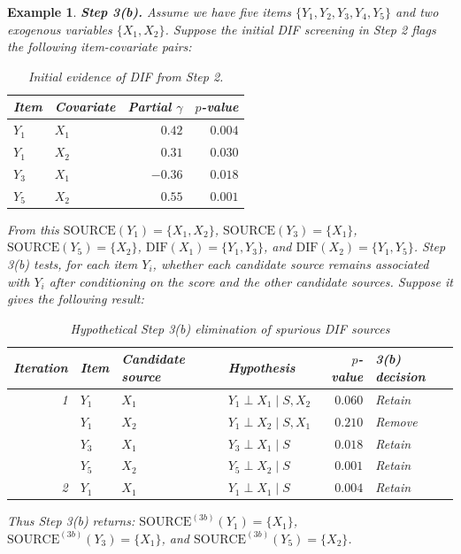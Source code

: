 \documentclass[12pt]{article}
\theoremstyle{examplestyle}
\newtheorem{example}{Example}[section]
\begin{document}
\begin{mybox3}
\begin{example}\label{ex:step3b} \textbf{Step 3(b).}
Assume we have five items $\{Y_1,Y_2,Y_3,Y_4,Y_5\}$ and two exogenous variables
$\{X_1,X_2\}$. Suppose the initial DIF screening in Step 2 flags the following
item-covariate pairs:

\begin{table}[H]
\centering
\begin{tabular}{llrr}
\hline
Item & Covariate & Partial $\gamma$ & $p$-value \\
\hline
$Y_1$ & $X_1$ & $0.42$ & $0.004$ \\
$Y_1$ & $X_2$ & $0.31$ & $0.030$ \\
$Y_3$ & $X_1$ & $-0.36$ & $0.018$ \\
$Y_5$ & $X_2$ & $0.55$ & $0.001$ \\
\hline
\end{tabular}
\caption{Initial evidence of DIF from Step 2.}
\label{tab:step3_example_initial}
\end{table}

From this $\mathrm{SOURCE}(Y_1)=\{X_1,X_2\}$, $\mathrm{SOURCE}(Y_3)=\{X_1\}$, $\mathrm{SOURCE}(Y_5)=\{X_2\}$, $\mathrm{DIF}(X_1)=\{Y_1,Y_3\}$, and $\mathrm{DIF}(X_2)=\{Y_1,Y_5\}$. Step 3(b) tests, for each item $Y_i$, whether each candidate source remains associated with $Y_i$ after conditioning on the score and the other candidate sources. Suppose it gives the following result:

\begin{table}[H]
\centering
\begin{tabular}{r l l l r l}
\hline
Iteration & Item & Candidate source & Hypothesis & $p$-value & 3(b) decision  \\
\hline
1 & $Y_1$ & $X_1$ & $Y_1 \perp X_1 \mid S, X_2$ & $0.060$ & Retain \\
  & $Y_1$ & $X_2$ & $Y_1 \perp X_2 \mid S,X_1$ & $0.210$ & Remove \\
  & $Y_3$ & $X_1$ & $Y_3 \perp X_1 \mid S$ & $0.018$ & Retain \\
  & $Y_5$ & $X_2$ & $Y_5 \perp X_2 \mid S$ & $0.001$ & Retain \\
2 & $Y_1$ & $X_1$ & $Y_1 \perp X_1 \mid S$ & $0.004$ & Retain \\
\hline
\end{tabular}
\caption{Hypothetical Step 3(b) elimination of spurious DIF sources}
\label{tab:step3_example_3b}
\end{table}
Thus Step 3(b) returns:
$\mathrm{SOURCE}^{(3b)}(Y_1)=\{X_1\}$, $\mathrm{SOURCE}^{(3b)}(Y_3)=\{X_1\}$, and
$\mathrm{SOURCE}^{(3b)}(Y_5)=\{X_2\}$.
\end{example}
\end{mybox3}
\end{document}
